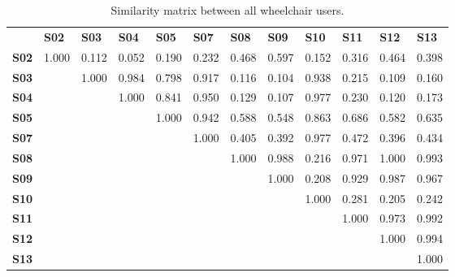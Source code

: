 \begin{table}[h]
\centering
\begin{tabular}{llllllllllll}
\textbf{}    & \textbf{S02} & \textbf{S03} & \textbf{S04} & \textbf{S05} & \textbf{S07} & \textbf{S08} & \textbf{S09} & \textbf{S10} & \textbf{S11} & \textbf{S12} & \textbf{S13} \\
\textbf{S02} & 1.000        & 0.112        & 0.052        & 0.190        & 0.232        & 0.468        & 0.597        & 0.152        & 0.316        & 0.464        & 0.398        \\
\textbf{S03} &              & 1.000        & 0.984        & 0.798        & 0.917        & 0.116        & 0.104        & 0.938        & 0.215        & 0.109        & 0.160        \\
\textbf{S04} &              &              & 1.000        & 0.841        & 0.950        & 0.129        & 0.107        & 0.977        & 0.230        & 0.120        & 0.173        \\
\textbf{S05} &              &              &              & 1.000        & 0.942        & 0.588        & 0.548        & 0.863        & 0.686        & 0.582        & 0.635        \\
\textbf{S07} &              &              &              &              & 1.000        & 0.405        & 0.392        & 0.977        & 0.472        & 0.396        & 0.434        \\
\textbf{S08} &              &              &              &              &              & 1.000        & 0.988        & 0.216        & 0.971        & 1.000        & 0.993        \\
\textbf{S09} &              &              &              &              &              &              & 1.000        & 0.208        & 0.929        & 0.987        & 0.967        \\
\textbf{S10} &              &              &              &              &              &              &              & 1.000        & 0.281        & 0.205        & 0.242        \\
\textbf{S11} &              &              &              &              &              &              &              &              & 1.000        & 0.973        & 0.992        \\
\textbf{S12} &              &              &              &              &              &              &              &              &              & 1.000        & 0.994        \\
\textbf{S13} &              &              &              &              &              &              &              &              &              &              & 1.000       
\end{tabular}
\caption{Similarity matrix between all wheelchair users.}
\label{distances}
\end{table}

